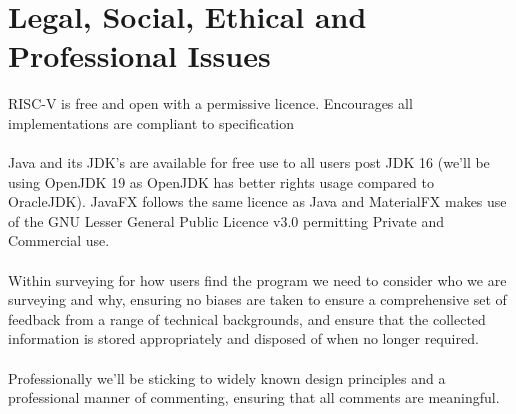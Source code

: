 \documentclass[a4paper,fleqn,12pt]{article}
\begin{document}
\section{Legal, Social, Ethical and Professional Issues}
RISC-V is free and open with a permissive licence. Encourages all implementations are compliant to specification \cite{risc_spec} 
\\\\
Java and its JDK's are available for free use to all users post JDK 16 (we'll be using OpenJDK 19 as OpenJDK has better rights usage compared to OracleJDK). JavaFX follows the same licence as Java and MaterialFX makes use of the GNU Lesser General Public Licence v3.0 \cite{gnu_2022_gnu_lesser_license} permitting Private and Commercial use.
\\\\
Within surveying for how users find the program we need to consider who we are surveying and why, ensuring no biases are taken to ensure a comprehensive set of feedback from a range of technical backgrounds, and ensure that the collected information is stored appropriately and disposed of when no longer required.
\\\\
Professionally we'll be sticking to widely known design principles and a professional manner of commenting, ensuring that all comments are meaningful.




\printbibliography
\end{document}
